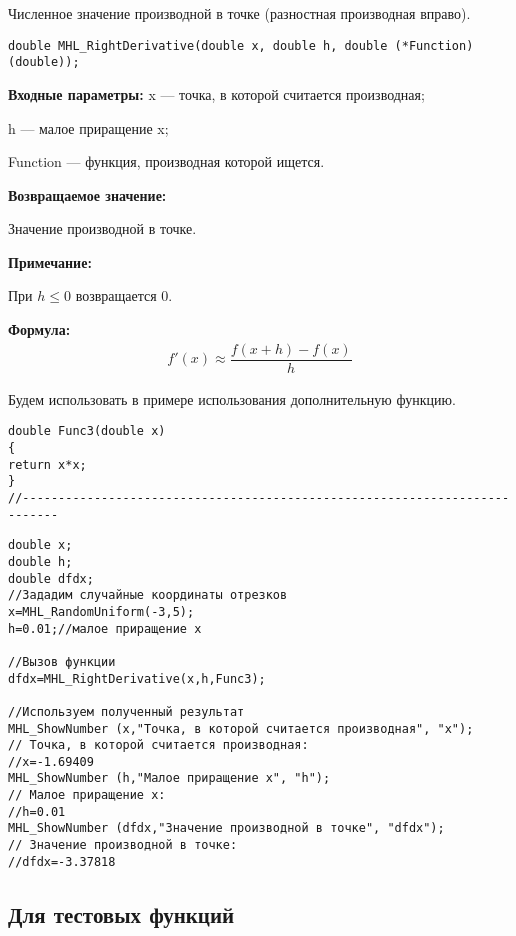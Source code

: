 \documentclass[a4paper,12pt]{article}
\begin{document}
Численное значение производной в точке (разностная производная вправо).


\begin{lstlisting}[label=code_syntax_MHL_RightDerivative,caption=Синтаксис]
double MHL_RightDerivative(double x, double h, double (*Function)(double));
\end{lstlisting}

\textbf{Входные параметры:}
 x --- точка, в которой считается производная;
 
 h --- малое приращение x;
 
 Function --- функция, производная которой ищется.

\textbf{Возвращаемое значение:}
 
 Значение производной в точке.
 
 \textbf{Примечание:}
 
 При $h\leq0$ возвращается $0$.

\textbf{Формула:}
\begin{eqnarray*}
f'\left( x\right) \approx \dfrac{f\left( x+h\right)-f\left( x\right) }{h}
\end{eqnarray*}

Будем использовать в примере использования дополнительную функцию.

\begin{lstlisting}[caption=Дополнительная функция]
double Func3(double x)
{
return x*x;
}
//---------------------------------------------------------------------------
\end{lstlisting}


\begin{lstlisting}[label=code_use_MHL_RightDerivative,caption=Пример использования]
double x;
double h;
double dfdx;
//Зададим случайные координаты отрезков
x=MHL_RandomUniform(-3,5);
h=0.01;//малое приращение x

//Вызов функции
dfdx=MHL_RightDerivative(x,h,Func3);

//Используем полученный результат
MHL_ShowNumber (x,"Точка, в которой считается производная", "x");
// Точка, в которой считается производная:
//x=-1.69409
MHL_ShowNumber (h,"Малое приращение x", "h");
// Малое приращение x:
//h=0.01
MHL_ShowNumber (dfdx,"Значение производной в точке", "dfdx");
// Значение производной в точке:
//dfdx=-3.37818
\end{lstlisting}

\subsection{Для тестовых функций}
\end{document}
